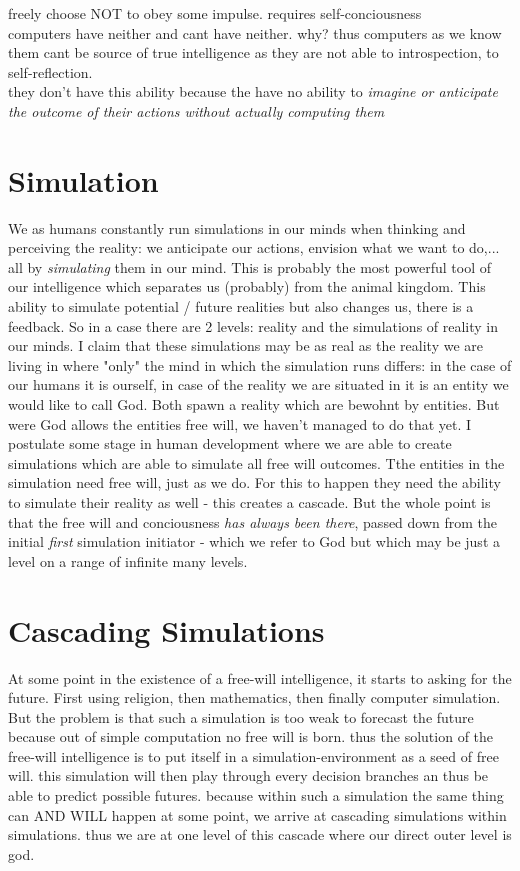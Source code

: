 \documentclass{article}
\begin{document}
freely choose NOT to obey some impulse. requires self-conciousness \\

computers have neither and cant have neither. why? thus computers as we know them cant be source of true intelligence as they are not able to introspection, to self-reflection. \\
they don't have this ability because the have no ability to \textit{imagine or anticipate the outcome of their actions without actually computing them}

\section{Simulation}
We as humans constantly run simulations in our minds when thinking and perceiving the reality: we anticipate our actions, envision what we want to do,... all by \textit{simulating} them in our mind. This is probably the most powerful tool of our intelligence which separates us (probably) from the animal kingdom. This ability to simulate potential / future realities but also changes us, there is a feedback.  So in a case there are 2 levels: reality and the simulations of reality in our minds.
I claim that these simulations may be as real as the reality we are living in where "only" the mind in which the simulation runs differs: in the case of our humans it is ourself, in case of the reality we are situated in it is an entity we would like to call God.
Both spawn a reality which are bewohnt by entities. But were God allows the entities free will, we haven't managed to do that yet. I postulate some stage in human development where we are able to create simulations which are able to simulate all free will outcomes. Tthe entities in the simulation need free will, just as we do. For this to happen they need the ability to simulate their reality as well - this creates a cascade. But the whole point is that the free will and conciousness \textit{has always been there}, passed down from the initial \textit{first} simulation initiator - which we refer to God but which may be just a level on a range of infinite many levels. 

\section{Cascading Simulations}
At some point in the existence of a free-will intelligence, it starts to asking for the future. First using religion, then mathematics, then finally computer simulation. But the problem is that such a simulation is too weak to forecast the future because out of simple computation no free will is born. thus the solution of the free-will intelligence is to put itself in a simulation-environment as a seed of free will. this simulation will then play through every decision branches an thus be able to predict possible futures. because within such a simulation the same thing can AND WILL happen at some point, we arrive at cascading simulations within simulations. thus we are at one level of this cascade where our direct outer level is god.
\end{document}
